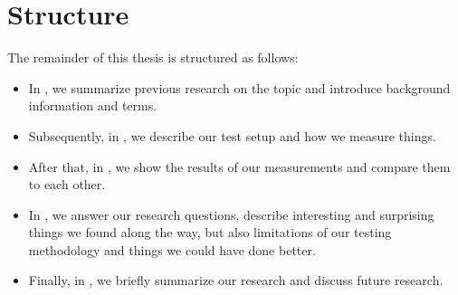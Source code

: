 \section{Structure}
The remainder of this thesis is structured as follows:
\begin{itemize}
  \item In , we summarize previous research on the topic and introduce background information and terms.
  \item Subsequently, in , we describe our test setup and how we measure things.
  \item After that, in , we show the results of our measurements and compare them to each other.
  \item In , we answer our research questions, describe interesting and surprising things we found along the way, but also limitations of our testing methodology and things we could have done better.
  \item Finally, in , we briefly summarize our research and discuss future research.
\end{itemize}
